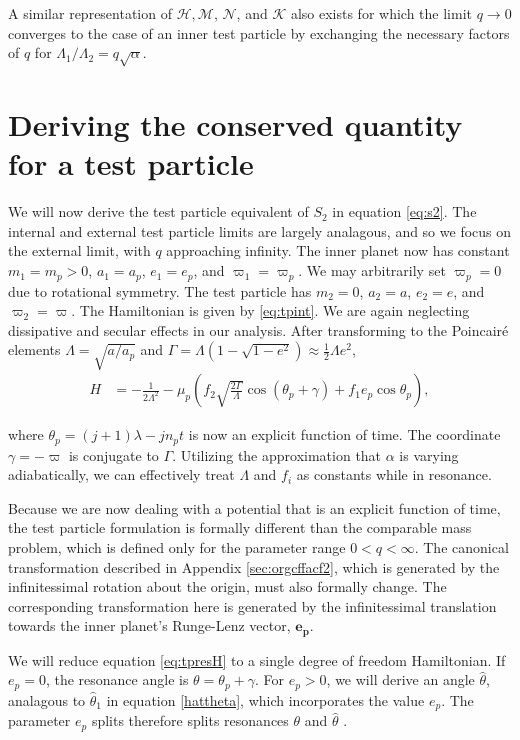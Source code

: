 \documentclass[usenatbib,twocolumn]{mnras}
\begin{document}
A similar representation of \(\mathcal H, \mathcal M\), \(\mathcal N\),
and \(\mathcal{K}\) also exists for which the limit \(q\to 0\) converges
to the case of an inner test particle by exchanging the necessary
factors of \(q\) for \(\Lambda_1/\Lambda_2 = q\sqrt\alpha\).
\section{Deriving the conserved quantity for a test particle}
\label{sec:orge4f55c2}
We will now derive the test particle equivalent of \(S_2\) in equation
\eqref{eq:s2}.  The internal and external test particle limits are
largely analagous, and so we focus on the external limit, with \(q\)
approaching infinity.  The inner planet now has constant \(m_1=m_p>0\),
\(a_1=a_p\), \(e_1=e_p\), and \(\varpi_1=\varpi_p\). We may arbitrarily set
\(\varpi_p=0\) due to rotational symmetry.  The test particle has
\(m_2=0\), \(a_2=a\), \(e_2=e\), and \(\varpi_2=\varpi\).  The Hamiltonian is
given by \eqref{eq:tpint}.  We are again neglecting dissipative and
secular effects in our analysis.  After transforming to the
Poincair\'e elements \(\Lambda=\sqrt{a/a_p}\) and
\(\Gamma=\Lambda(1-\sqrt{1-e^2})\approx \frac12\Lambda e^2\),
\begin{align}
\label{eq:tpresH}
  H
  &= - \frac{1}{2\Lambda^2} - \mu_p\left(f_2
    \sqrt{\frac{2\Gamma}{\Lambda}}\cos(\theta_p+\gamma) + f_1 e_p\cos\theta_p\right),
\end{align}

\noindent
where \(\theta_p = (j+1)\lambda - jn_pt\) is now an explicit
function of time. The coordinate \(\gamma=-\varpi\) is conjugate
to \(\Gamma\). Utilizing the approximation that \(\alpha\) is varying
adiabatically, we can effectively treat \(\Lambda\) and \(f_i\) as
constants while in resonance. 

Because we are now dealing with a potential that is an explicit
function of time, the test particle formulation is formally different
than the comparable mass problem, which is defined only for the
parameter range \(0<q<\infty\).  The canonical transformation described
in Appendix \ref{sec:orgcffacf2}, which is generated by the infinitessimal rotation
about the origin, must also formally change.  The corresponding
transformation here is generated by the infinitessimal translation
towards the inner planet's Runge-Lenz vector, \(\mathbf{e_p}\).

We will reduce equation \eqref{eq:tpresH} to a single
degree of freedom Hamiltonian. If \(e_p=0\), the resonance
angle is \(\theta=\theta_p+\gamma\). For \(e_p>0\), we will
derive an angle \(\hat\theta\), analagous to \(\hat\theta_1\)
in equation \eqref{hattheta}, which incorporates the value \(e_p\).
The parameter \(e_p\) splits therefore splits
resonances \(\theta\) and \(\hat\theta\)
\citep[c.f. ][]{wisdom_canonical_1986,moutamid17_deriv_captur_probab_corot_eccen}.
\end{document}
